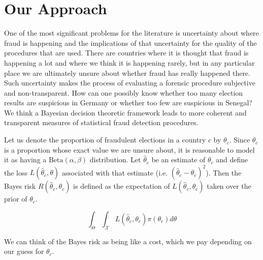 \section{Our Approach}

One of the most significant problems for the literature is uncertainty about where fraud is happening and the implications of that uncertainty for the quality of the procedures that are used. There are countries where it is thought that fraud is happening a lot and where we think it is happening rarely, but in any particular place we are ultimately unsure about whether fraud has really happened there. Such uncertainty makes the process of evaluating a forensic procedure subjective and non-transparent. How can one possibly know whether too many election results are suspicious in Germany or whether too few are suspicious in Senegal? We think a Bayesian decision theoretic framework leads to more coherent and transparent measures of statistical fraud detection procedures.  

Let us denote the proportion of fraudulent elections in a country $c$ by $\theta_c$. Since $\theta_c$ is a proportion whose exact value we are unsure about, it is reasonable to model it as having a $\textrm{Beta}(\alpha,\beta)$ distribution.  Let $\hat{\theta}_c$ be an estimate of $\theta_c$ and define the loss $L(\hat{\theta}_c,\theta)$ associated with that estimate (i.e. $(\hat{\theta}_c - \theta_c)^2$).  Then the Bayes risk $R(\hat{\theta}_c,\theta_c)$ is defined as the expectation of $L(\hat{\theta}_c,\theta_c)$ taken over the prior of $\theta_c$.

$$ \int_\Theta \int_\mathcal{X} L(\hat{\theta}_c,\theta_c) \pi(\theta_c) d\theta $$

We can think of the Bayes risk as being like a cost, which we pay depending on our guess for $\theta_c$.

